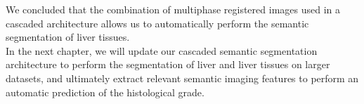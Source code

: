 We concluded that the combination of multiphase registered images used in a cascaded architecture allows us to automatically perform the semantic segmentation of liver tissues. \\
In the next chapter, we will update our cascaded semantic segmentation architecture to perform the segmentation of liver and liver tissues on larger datasets, and ultimately extract relevant semantic imaging features to perform an automatic prediction of the histological grade.

